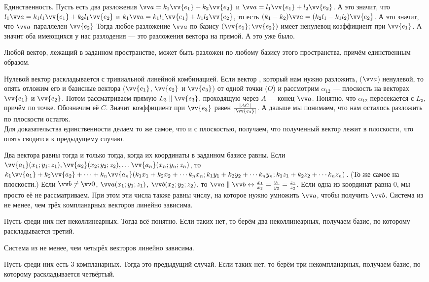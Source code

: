 \documentclass{article}
\let\vec\vv
\begin{document}
\begin{itemize}
\begin{Proof}
            Единственность. Пусть есть два разложения $\vec a=k_1\vec{e_1}+k_2\vec{e_2}$ и $\vec a=l_1\vec{e_1}+l_2\vec{e_2}$. А это значит, что $l_1\vec a=k_1l_1\vec{e_1}+k_2l_1\vec{e_2}$ и $k_1\vec a=k_1l_1\vec{e_1}+k_1l_2\vec{e_2}$, то есть $(k_1-k_2)\vec a=(k_2l_1-k_1l_2)\vec{e_2}$. А это значит, что $\vec a$ параллелен $\vec{e_2}$ Тогда любое разложение $\vec a$ по базису $(\vec{e_1};\vec{e_2})$ имеет ненулевоц коэффициент при $\vec{e_1}$. А значит оба имеющихся у нас разлодения --- это разложения вектора на прямой. А это уже было.
        \end{Proof}
        \thm Любой вектор, лежащий в заданном пространстве, может быть разложен по любому базису этого пространства, причём единственным образом.
        \begin{Proof}
            Нулевой вектор раскладывается с тривиальной линейной комбинацией.
            Если вектор , который нам нужно разложить, ($\vec a$) ненулевой, то опять отложим его и базисные вектора ($\vec{e_1}$, $\vec{e_2}$ и $\vec{e_3}$) от одной точки ($O$) и рассмотрим $\alpha_{12}$ --- плоскость на векторах $\vec{e_1}$ и $\vec{e_2}$. Потом рассматриваем прямую $L_3\parallel\vec{e_3}$, проходящую через $A$ --- конец $\vec a$. Понятно, что $\alpha_{12}$ пересекается с $L_3$, причём по точке. Обозначим её $C$. Значит коэффициент при $\vec{e_3}$ равен $\frac{|AC|}{|\vec{e_3}|}$. А дальше мы понимаем, что нам осталось разложить по плоскости остаток.\\
            Для доказательства единственности делаем то же самое, что и с плоскостью, получаем, что полученный вектор лежит в плоскости, что опять сводится к предыдущему случаю.
        \end{Proof}
        \thm Два вектора равны тогда и только тогда, когда их координаты в заданном базисе равны.
        \thm Если $\vec{a_1}(x_1;y_1;z_1),\vec{a_2}(x_2;y_2;z_2),\ldots\vec{a_n}(x_n;y_n;z_n)$, то $k_1\vec{a_1}+k_2\vec{a_2}+\cdots+k_n\vec{a_n}(k_1x_1+k_2x_2+\cdots k_nx_n;k_1y_1+k_2y_2+\cdots k_ny_n;k_1z_1+k_2z_2+\cdots k_nz_n)$. (То же самое на плоскости.)
        \thm Если $\vec b\neq\vec0$, $\vec a(x_1;y_1;z_1)$, $\vec b(x_2;y_2;z_2)$, то $\vec a\parallel\vec b\leftrightarrow\frac{x_1}{x_2}=\frac{y_1}{y_2}=\frac{z_1}{z_2}$. Если одна из координат равна $0$, мы просто её не рассматриваем. При этом эти числа также равны числу, на которое нужно умножить $\vec a$, чтобы получить $\vec b$.
        \thm Система из не менее, чем трёх компланарных векторов линейно зависима.
        \begin{Proof}
            Пусть среди них нет неколлинеарных. Тогда всё понятно. Если таких нет, то берём два неколлинеарных, получаем базис, по которому раскладывается третий.
        \end{Proof}
        \thm Система из не менее, чем четырёх векторов линейно зависима.
        \begin{Proof}
            Пусть среди них есть 3 компланарных. Тогда это предыдущий случай. Если таких нет, то берём три некомпланарных, получаем базис, по которому раскладывается четвёртый.
        \end{Proof}
    \end{itemize}
\end{document}
